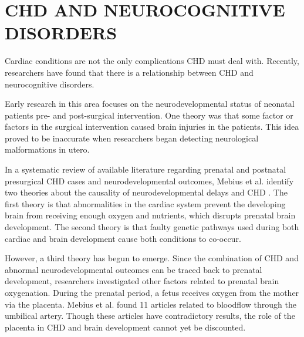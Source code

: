 
\section{CHD AND NEUROCOGNITIVE DISORDERS}

Cardiac conditions are not the only complications CHD must deal with. Recently, researchers have found that there is a relationship between CHD and neurocognitive disorders. 


Early research in this area focuses on the neurodevelopmental status of neonatal patients pre- and post-surgical intervention. One theory was that some factor or factors in the surgical intervention caused brain injuries in the patients. This idea proved to be inaccurate when researchers began detecting neurological malformations in utero.

In a systematic review of available literature regarding prenatal and postnatal presurgical CHD cases and neurodevelopmental outcomes, Mebius et al. identify two theories about the causality of  neurodevelopmental delays and CHD \cite{Mebius2017}. The first theory is that abnormalities in the cardiac system prevent the developing brain from receiving enough oxygen and nutrients, which disrupts prenatal brain development. The second theory is that faulty genetic pathways used during both cardiac and brain development cause both conditions to co-occur. 

However, a third theory has begun to emerge. Since the combination of CHD and abnormal neurodevelopmental outcomes can be traced back to prenatal development, researchers investigated other factors related to prenatal brain oxygenation. During the prenatal period, a fetus receives oxygen from the mother via the placenta. Mebius et al. found 11 articles related to bloodflow through the umbilical artery. Though these articles have contradictory results, the role of the placenta in CHD and brain development cannot yet be discounted.


